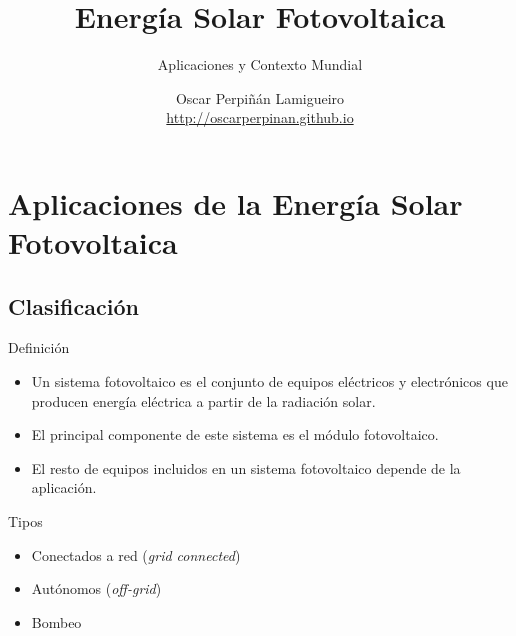 \documentclass[xcolor={usenames,svgnames,dvipsnames}]{beamer}
\author{Oscar Perpiñán Lamigueiro \\ \url{http://oscarperpinan.github.io}}
\date{}
\title{Energía Solar Fotovoltaica}
\subtitle{Aplicaciones y Contexto Mundial}
\begin{document}
\maketitle

\section{Aplicaciones de la Energía Solar Fotovoltaica}
\label{sec:orgdda37ec}

\subsection{Clasificación}
\label{sec:org50b6ca4}

\begin{frame}[label={sec:org9c2bd45}]{Definición}
\begin{itemize}
\item Un sistema fotovoltaico es el conjunto de equipos eléctricos y
electrónicos que producen energía eléctrica a partir de la radiación
solar.

\item El principal componente de este sistema es el módulo fotovoltaico.

\item El resto de equipos incluidos en un sistema fotovoltaico depende de la aplicación.
\end{itemize}

\begin{block}{Tipos}
\begin{itemize}
\item Conectados a red (\emph{grid connected})

\item Autónomos (\emph{off-grid})

\item Bombeo
\end{itemize}
\end{block}
\end{frame}
\end{document}
